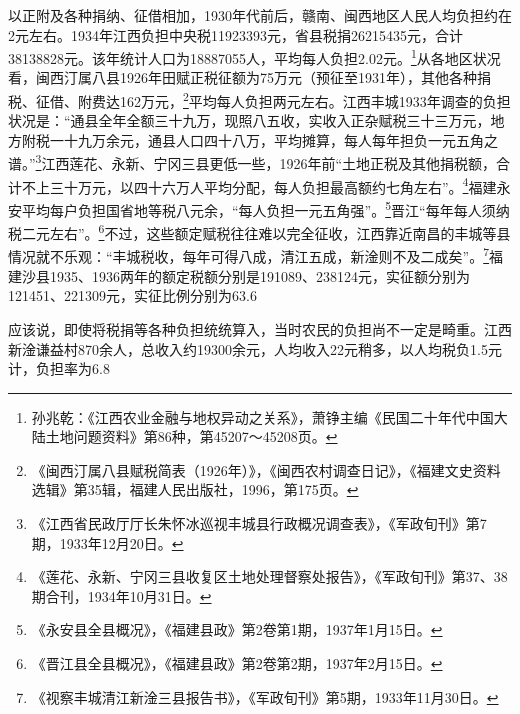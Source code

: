 以正附及各种捐纳、征借相加，1930年代前后，赣南、闽西地区人民人均负担约在2元左右。1934年江西负担中央税11923393元，省县税捐26215435元，合计38138828元。该年统计人口为18887055人，平均每人负担2.02元。\footnote{孙兆乾：《江西农业金融与地权异动之关系》，萧铮主编《民国二十年代中国大陆土地问题资料》第86种，第45207～45208页。}从各地区状况看，闽西汀属八县1926年田赋正税征额为75万元（预征至1931年），其他各种捐税、征借、附费达162万元，\footnote{《闽西汀属八县赋税简表（1926年）》，《闽西农村调查日记》，《福建文史资料选辑》第35辑，福建人民出版社，1996，第175页。}平均每人负担两元左右。江西丰城1933年调查的负担状况是：“通县全年全额三十九万，现照八五收，实收入正杂赋税三十三万元，地方附税一十九万余元，通县人口四十八万，平均摊算，每人每年担负一元五角之谱。”\footnote{《江西省民政厅厅长朱怀冰巡视丰城县行政概况调查表》，《军政旬刊》第7期，1933年12月20日。}江西莲花、永新、宁冈三县更低一些，1926年前“土地正税及其他捐税额，合计不上三十万元，以四十六万人平均分配，每人负担最高额约七角左右”。\footnote{《莲花、永新、宁冈三县收复区土地处理督察处报告》，《军政旬刊》第37、38期合刊，1934年10月31日。}福建永安平均每户负担国省地等税八元余，“每人负担一元五角强”。\footnote{《永安县全县概况》，《福建县政》第2卷第1期，1937年1月15日。}晋江“每年每人须纳税二元左右”。\footnote{《晋江县全县概况》，《福建县政》第2卷第2期，1937年2月15日。}不过，这些额定赋税往往难以完全征收，江西靠近南昌的丰城等县情况就不乐观：“丰城税收，每年可得八成，清江五成，新淦则不及二成矣”。\footnote{《视察丰城清江新淦三县报告书》，《军政旬刊》第5期，1933年11月30日。}福建沙县1935、1936两年的额定税额分别是191089、238124元，实征额分别为121451、221309元，实征比例分别为63.6%


应该说，即使将税捐等各种负担统统算入，当时农民的负担尚不一定是畸重。江西新淦谦益村870余人，总收入约19300余元，人均收入22元稍多，以人均税负1.5元计，负担率为6.8%


